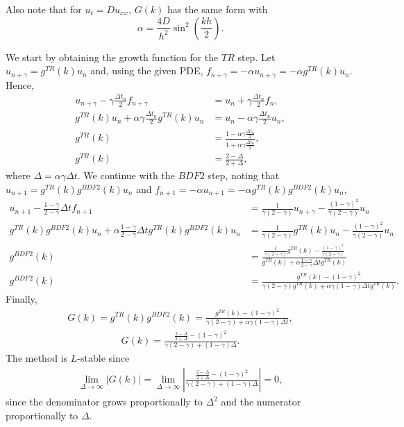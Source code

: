 \begin{questions}
{Also note that for $u_t = D u_{xx}$, $G(k)$ has the same form with
\begin{displaymath} 
        \alpha = \frac{4 D}{h^2} \sin^2\left(\frac{k h}{2}\right) .
\end{displaymath}
}
\begin{solution}
We start by obtaining the growth function for the $TR$ step. Let $u_{n+\gamma}=g^{TR}(k)u_n$ and, using the given PDE, $f_{n+\gamma}=-\alpha u_{n+\gamma}=-\alpha g^{TR}(k)u_n$. Hence,
\begin{align*}
u_{n+\gamma}-\gamma\frac{\Delta t_n}{2}f_{n+\gamma}&=u_n+\gamma
\frac{\Delta t_n}{2}f_n,\\
g^{TR}(k)u_n+\alpha\gamma\frac{\Delta t_n}{2} g^{TR}(k)u_n&=u_n-
\alpha\gamma\frac{\Delta t_n}{2}u_n,\\
g^{TR}(k)&=\frac{1-\alpha\gamma\frac{\Delta t_n}{2}}{1+\alpha\gamma\frac{\Delta t_n}{2} },\\
g^{TR}(k)&=\frac{2-\Delta}{2+\Delta},
\end{align*}
where $\Delta=\alpha\gamma\Delta t$. We continue with the $BDF2$ step, noting that $u_{n+1}=g^{TR}(k)g^{BDF2}(k)u_n$ and $f_{n+1}=-\alpha u_{n+1}=-\alpha g^{TR}(k)g^{BDF2}(k)u_n$,
\begin{align*}
u_{n+1}-\frac{1-\gamma}{2-\gamma}\Delta tf_{n+1}&=\frac{1}{\gamma(2-\gamma)}u_{n+\gamma}-\frac{(1-\gamma)^2}{\gamma(2-\gamma)}u_n\\
g^{TR}(k)g^{BDF2}(k)u_n+\alpha\frac{1-\gamma}{2-\gamma}\Delta tg^{TR}(k)g^{BDF2}(k)u_n&=\frac{1}{\gamma(2-\gamma)}g^{TR}(k)u_n-\frac{(1-\gamma)^2}{\gamma(2-\gamma)}u_n\\
g^{BDF2}(k)&=\frac{\frac{1}{\gamma(2-\gamma)}g^{TR}(k)-\frac{(1-\gamma)^2}{\gamma(2-\gamma)}}{g^{TR}(k)+\alpha\frac{1-\gamma}{2-\gamma}\Delta tg^{TR}(k)}\\
g^{BDF2}(k)&=\frac{g^{TR}(k)-(1-\gamma)^2}{\gamma(2-\gamma)g^{TR}(k)+\alpha\gamma(1-\gamma)\Delta tg^{TR}(k)}.
\end{align*}
Finally,
\begin{align*}
G(k)=g^{TR}(k)g^{BDF2}(k)=\frac{g^{TR}(k)-(1-\gamma)^2}{\gamma(2-\gamma)+\alpha\gamma(1-\gamma)\Delta t},
\end{align*}
\begin{align*}
G(k)=\frac{\frac{2-\Delta}{2+\Delta}-(1-\gamma)^2}{\gamma(2-\gamma)+(1-\gamma)\Delta}.
\end{align*}
The method is $L$-stable since
\begin{align*}
\lim_{\Delta\rightarrow\infty} |G(k)|=\lim_{\Delta\rightarrow\infty} \left|\frac{\frac{2-\Delta}{2+\Delta}-(1-\gamma)^2}{\gamma(2-\gamma)+(1-\gamma)\Delta}\right|=0,
\end{align*}
since the denominator grows proportionally to $\Delta^2$ and the numerator proportionally to $\Delta$.
\end{solution}
\end{questions}
